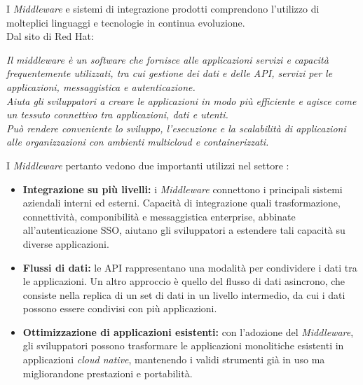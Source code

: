 I \textit{Middleware} e sistemi di integrazione prodotti comprendono l'utilizzo di molteplici linguaggi e tecnologie in continua evoluzione.\\
Dal sito di Red Hat:
\begin{displayquote}
  \textit{Il middleware è un software che fornisce alle applicazioni servizi e capacità frequentemente utilizzati, tra cui gestione dei dati e delle API, servizi per le applicazioni, messaggistica e autenticazione.\\
  Aiuta gli sviluppatori a creare le applicazioni in modo più efficiente e agisce come un tessuto connettivo tra applicazioni, dati e utenti.\\
  Può rendere conveniente lo sviluppo, l'esecuzione e la scalabilità di applicazioni alle organizzazioni con ambienti multicloud e containerizzati.}
\end{displayquote}
\noindent
I \textit{Middleware} pertanto vedono due importanti utilizzi nel settore :
\begin{itemize}
  \item \textbf{Integrazione su più livelli:} i \textit{Middleware} connettono i principali sistemi aziendali interni ed esterni. Capacità di integrazione quali trasformazione, connettività, componibilità e messaggistica enterprise, abbinate all'autenticazione SSO, aiutano gli sviluppatori a estendere tali capacità su diverse applicazioni.
  \item \textbf{Flussi di dati:} le API rappresentano una modalità per condividere i dati tra le applicazioni. Un altro approccio è quello del flusso di dati asincrono, che consiste nella replica di un set di dati in un livello intermedio, da cui i dati possono essere condivisi con più applicazioni.
  \item \textbf{Ottimizzazione di applicazioni esistenti:} con l'adozione del \textit{Middleware}, gli sviluppatori possono trasformare le applicazioni monolitiche esistenti in applicazioni \textit{cloud native}, mantenendo i validi strumenti già in uso ma migliorandone prestazioni e portabilità.
\end{itemize}



